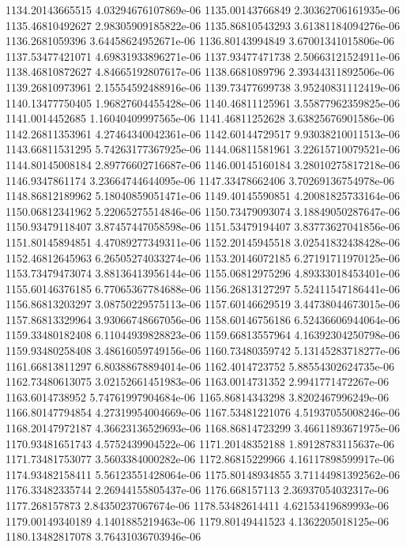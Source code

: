 {1134.20143665515 4.03294676107869e-06
1135.00143766849 2.30362706161935e-06
1135.46810492627 2.98305909185822e-06
1135.86810543293 3.61381184094276e-06
1136.2681059396 3.64458624952671e-06
1136.80143994849 3.67001341015806e-06
1137.53477421071 4.69831933896271e-06
1137.93477471738 2.50663121524911e-06
1138.46810872627 4.84665192807617e-06
1138.6681089796 2.39344311892506e-06
1139.26810973961 2.15554592488916e-06
1139.73477699738 3.95240831112419e-06
1140.13477750405 1.96827604455428e-06
1140.46811125961 3.55877962359825e-06
1141.0014452685 1.16040409997565e-06
1141.46811252628 3.63825676901586e-06
1142.26811353961 4.27464340042361e-06
1142.60144729517 9.93038210011513e-06
1143.66811531295 5.74263177367925e-06
1144.06811581961 3.22615710079521e-06
1144.80145008184 2.89776602716687e-06
1146.00145160184 3.28010275817218e-06
1146.9347861174 3.23664744644095e-06
1147.33478662406 3.70269136754978e-06
1148.86812189962 5.18040859051471e-06
1149.40145590851 4.20081825733164e-06
1150.06812341962 5.22065275514846e-06
1150.73479093074 3.18849050287647e-06
1150.93479118407 3.87457447058598e-06
1151.53479194407 3.83773627041856e-06
1151.80145894851 4.47089277349311e-06
1152.20145945518 3.02541832438428e-06
1152.46812645963 6.26505274033274e-06
1153.20146072185 6.27191711970125e-06
1153.73479473074 3.88136413956144e-06
1155.06812975296 4.89333018453401e-06
1155.60146376185 6.77065367784688e-06
1156.26813127297 5.52411547186441e-06
1156.86813203297 3.08750229575113e-06
1157.60146629519 3.44738044673015e-06
1157.86813329964 3.93066748667056e-06
1158.60146756186 6.52436606944064e-06
1159.33480182408 6.11044939828823e-06
1159.66813557964 4.16392304250798e-06
1159.93480258408 3.48616059749156e-06
1160.73480359742 5.13145283718277e-06
1161.66813811297 6.80388678894014e-06
1162.4014723752 5.88554302624735e-06
1162.73480613075 3.02152661451983e-06
1163.0014731352 2.9941771472267e-06
1163.6014738952 5.74761997904684e-06
1165.86814343298 3.8202467996249e-06
1166.80147794854 4.27319954004669e-06
1167.53481221076 4.51937055008246e-06
1168.20147972187 4.36623136529693e-06
1168.86814723299 3.46611893671975e-06
1170.93481651743 4.5752439904522e-06
1171.20148352188 1.89128783115637e-06
1171.73481753077 3.5603384000282e-06
1172.86815229966 4.16117898599917e-06
1174.93482158411 5.56123551428064e-06
1175.80148934855 3.71144981392562e-06
1176.33482335744 2.26944155805437e-06
1176.668157113 2.36937054032317e-06
1177.268157873 2.84350237067674e-06
1178.53482614411 4.62153419689993e-06
1179.00149340189 4.1401885219463e-06
1179.80149441523 4.1362205018125e-06
1180.13482817078 3.76431036703946e-06
}
